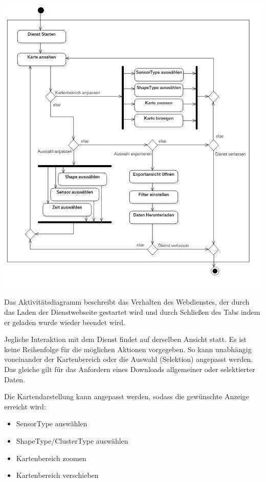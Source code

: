     \subsection{}
        \includegraphics[width=1\linewidth]{diagrams/ActivityDiagram1.png}
        
        Das Aktivitätsdiagramm beschreibt das Verhalten des Webdienstes, der durch das Laden der Dienstwebseite gestartet wird und durch Schließen des Tabs indem er geladen wurde wieder beendet wird.
        
        Jegliche Interaktion mit dem Dienst findet auf derselben Ansicht statt. Es ist keine Reihenfolge für die möglichen Aktionen vorgegeben. So kann unabhängig voneinander der Kartenbereich oder die Auswahl (Selektion) angepasst werden. Das gleiche gilt für das Anfordern eines Downloads allgemeiner oder selektierter Daten.
        
        Die Kartendarstellung kann angepasst werden, sodass die gewünschte Anzeige erreicht wird:
        \begin{itemize}
            \item SensorType auswählen
            \item ShapeType/ClusterType auswählen
            \item Kartenbereich zoomen
            \item Kartenbereich verschieben
        \end{itemize}

